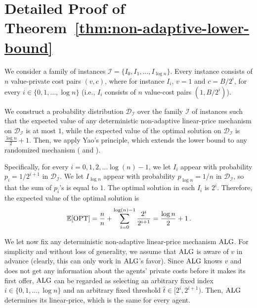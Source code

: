 \section{Detailed Proof of Theorem~\ref{thm:non-adaptive-lower-bound}}
\label{sec:app:lower_bound}


We consider a family of instances $\mathcal{I} = \{ I_0, I_1, ..., I_{\log n} \}$. Every instance consists of $n$ value-private cost pairs $(v,c)$, where for instance $I_i$, $v = 1$ and $c = B/2^i$, for every $i \in \{0,1,...,\log n\}$ (i.e., $I_i$ consists of $n$ value-cost pairs $(1, B/2^i)$).

We construct a probability distribution $\mathcal{D}_{\mathcal{I}}$ over the family $\mathcal{I}$ of instances such that the expected value of any deterministic non-adaptive linear-price mechanism on $\mathcal{D}_{\mathcal{I}}$ is at most $1$, while the expected value of the optimal solution on $\mathcal{D}_{\mathcal{I}}$ is $\frac{\log n}{2}+1$. Then, we apply Yao's principle, which extends the lower bound to any randomized mechanism (\cite[Chapter~8.4]{BoroYan1998} and \cite{Yao1977}). 

Specifically, for every $i = 0, 1, 2, \ldots \log(n)-1$, we let $I_{i}$ appear with probability $p_{i} = 1/2^{i+1}$ in $\mathcal{D}_{\mathcal{I}}$. We let $I_{\log n}$ appear with probability $p_{\log n} = 1/n$ in $\mathcal{D}_{\mathcal{I}}$, so that the sum of $p_i$'s is equal to $1$. The optimal solution in each $I_{i}$ is $2^i$. Therefore, the expected value of the optimal solution is 
%
\[ \mathbb{E}[\mathrm{OPT}] = \frac{n}{n} + \sum_{i=0}^{\log(n)-1} \frac{2^i}{2^{i+1}}
=\frac{\log n}{2}+1\,.
\]

We let now fix any deterministic non-adaptive linear-price mechanism $\mathrm{ALG}$. For simplicity and without loss of generality, we assume that $\mathrm{ALG}$ is aware of $v$ in advance (clearly, this can only work in $\mathrm{ALG}$'s favor). 
%
Since $\mathrm{ALG}$ knows $v$ and does not get any information about the agents' private costs before it makes its first offer, $\mathrm{ALG}$ can be regarded as selecting an arbitrary fixed index $i \in \{ 0, 1, \ldots, \log n\}$ and an arbitrary fixed threshold $\hat{t} \in [2^i, 2^{i+1})$. Then, $\mathrm{ALG}$ determines its linear-price, which is the same for every agent. 

